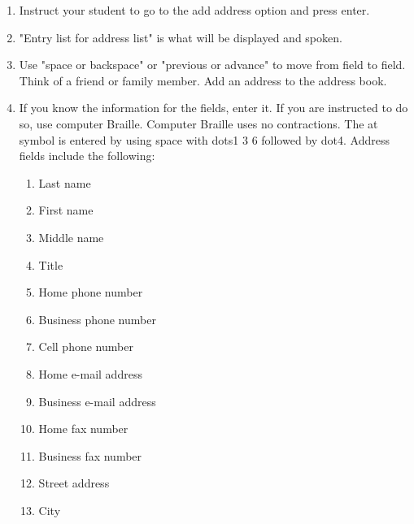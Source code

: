 \documentclass[10pt,letterpaper,twoside]{report}
\begin{document}
{{{{\begin{enumerate}
	\item Instruct your student to go to the add address option and press enter.
	      
	\item "Entry list for address list" is what will be displayed and spoken.
	      
	\item Use "space or backspace" or "previous or advance" to move from field to field.  Think of a friend or family member.  Add an address to the address book.
	      
	\item If you know the information for the fields, enter it.  If you are instructed to do so, use computer Braille.  Computer Braille uses no contractions.  The at symbol is entered by using space with dots1 3 6 followed by dot4. Address fields include the following:
	      
	      \begin{enumerate}
		      \item Last name
		            
		      \item First name
		            
		      \item Middle name
		            
		      \item Title
		            
		      \item Home phone number
		            
		      \item Business phone number
		            
		      \item Cell phone number
		            
		      \item Home e-mail address
		            
		      \item Business e-mail address
		            
		      \item Home fax number
		            
		      \item Business fax number
		            
		      \item Street address
		            
		      \item City
		            

\end{enumerate}
\end{enumerate}}}}}
\end{document}
